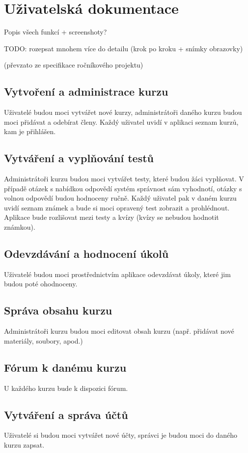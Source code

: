 \chapter{Uživatelská dokumentace}
Popis všech funkcí + screenshoty?

TODO: rozepsat mnohem více do detailu (krok po kroku + snímky obrazovky)

(převzato ze specifikace ročníkového projektu)

\section{Vytvoření a administrace kurzu}
Uživatelé budou moci vytvářet nové kurzy, administrátoři daného kurzu budou moci přidávat a odebírat členy. Každý uživatel uvidí v aplikaci seznam kurzů, kam je přihlášen.

\section{Vytváření a vyplňování testů}
Administrátoři kurzu budou moci vytvářet testy, které budou žáci vyplňovat. V případě otázek s nabídkou odpovědí systém správnost sám vyhodnotí, otázky s volnou odpovědí budou hodnoceny ručně. Každý uživatel pak v daném kurzu uvidí seznam známek a bude si moci opravený test zobrazit a prohlédnout. Aplikace bude rozlišovat mezi testy a kvízy (kvízy se nebudou hodnotit známkou).

\section{Odevzdávání a hodnocení úkolů}
Uživatelé budou moci prostřednictvím aplikace odevzdávat úkoly, které jim budou poté ohodnoceny.

\section{Správa obsahu kurzu}
Administrátoři kurzu budou moci editovat obsah kurzu (např. přidávat nové materiály, soubory, apod.) 

\section{Fórum k danému kurzu}
U každého kurzu bude k dispozici fórum. 

\section{Vytváření a správa účtů}
Uživatelé si budou moci vytvářet nové účty, správci je budou moci do daného kurzu zapsat.
